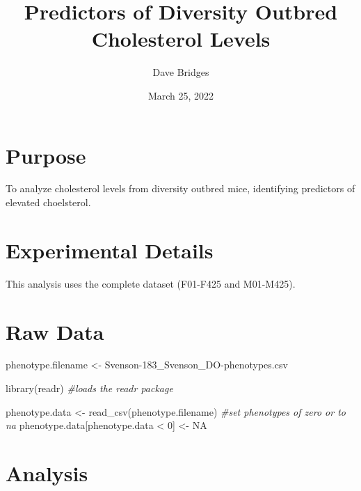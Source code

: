 \documentclass[
]{article}
\title{Predictors of Diversity Outbred Cholesterol Levels}
\author{Dave Bridges}
\date{March 25, 2022}
\newenvironment{Shaded}{\begin{snugshade}}{\end{snugshade}}
\newcommand{\CommentTok}[1]{\textcolor[rgb]{0.56,0.35,0.01}{\textit{#1}}}
\newcommand{\ConstantTok}[1]{\textcolor[rgb]{0.00,0.00,0.00}{#1}}
\newcommand{\DecValTok}[1]{\textcolor[rgb]{0.00,0.00,0.81}{#1}}
\newcommand{\FunctionTok}[1]{\textcolor[rgb]{0.00,0.00,0.00}{#1}}
\newcommand{\NormalTok}[1]{#1}
\newcommand{\OtherTok}[1]{\textcolor[rgb]{0.56,0.35,0.01}{#1}}
\newcommand{\SpecialCharTok}[1]{\textcolor[rgb]{0.00,0.00,0.00}{#1}}
\newcommand{\StringTok}[1]{\textcolor[rgb]{0.31,0.60,0.02}{#1}}
\begin{document}
\maketitle

{
\setcounter{tocdepth}{2}
\tableofcontents
}
\hypertarget{purpose}{%
\section{Purpose}\label{purpose}}

To analyze cholesterol levels from diversity outbred mice, identifying
predictors of elevated choelsterol.

\hypertarget{experimental-details}{%
\section{Experimental Details}\label{experimental-details}}

This analysis uses the complete dataset (F01-F425 and M01-M425).

\hypertarget{raw-data}{%
\section{Raw Data}\label{raw-data}}

\begin{Shaded}
\begin{Highlighting}[]
\NormalTok{phenotype.filename }\OtherTok{\textless{}{-}} \StringTok{\textquotesingle{}Svenson{-}183\_Svenson\_DO{-}phenotypes.csv\textquotesingle{}}
\end{Highlighting}
\end{Shaded}

\begin{Shaded}
\begin{Highlighting}[]
\FunctionTok{library}\NormalTok{(readr) }\CommentTok{\#loads the readr package}


\NormalTok{phenotype.data }\OtherTok{\textless{}{-}} \FunctionTok{read\_csv}\NormalTok{(phenotype.filename)}
\CommentTok{\#set phenotypes of zero or  to na}
\NormalTok{phenotype.data[phenotype.data }\SpecialCharTok{\textless{}} \DecValTok{0}\NormalTok{] }\OtherTok{\textless{}{-}} \ConstantTok{NA}
\end{Highlighting}
\end{Shaded}

\hypertarget{analysis}{%
\section{Analysis}\label{analysis}}
\end{document}
